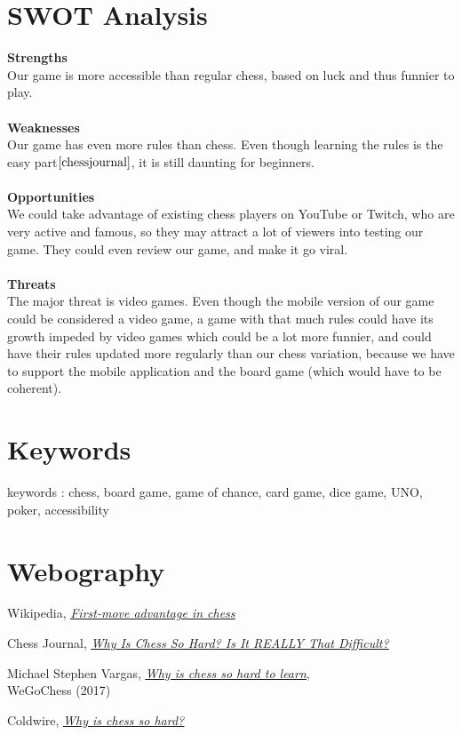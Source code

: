 \documentclass[12pt]{article}
\begin{document}
    \section{SWOT Analysis}
    \textbf{Strengths}
    \\Our game is more accessible than regular chess, based on luck and thus funnier to play.
    \\\\\textbf{Weaknesses}
    \\Our game has even more rules than chess. Even though learning the rules is the easy part$\cite{chessjournal}$, it is still daunting for beginners.
    \\\\\textbf{Opportunities}
    \\We could take advantage of existing chess players on YouTube or Twitch, who are very active and famous, so they may attract a lot of viewers into testing our game. They could even review our game, and make it go viral.
    \\\\\textbf{Threats} 
    \\The major threat is video games. Even though the mobile version of our game could be considered a video game, a game with that much rules could have its growth impeded by video games which could be a lot more funnier, and could have their rules updated more regularly than our chess variation, because we have to support the mobile application and the board game (which would have to be coherent).

    \section{Keywords}
        keywords : chess, board game, game of chance, card game, dice game, UNO, poker, accessibility
    
    \section{Webography}
        \begin{thebibliography}{9}
                Wikipedia, \textit{\href{https://en.wikipedia.org/wiki/First-move_advantage_in_chess}{\underline{First-move advantage in chess}} }
                
                Chess Journal, \textit{\href{https://www.chessjournal.com/why-is-chess-so-hard/}{\underline{Why Is Chess So Hard? Is It REALLY That Difficult?}} }
            
                Michael Stephen Vargas, \href{
        https://wegochess.com/why-is-chess-so-hard-to-learn/}{\underline{\textit{Why is chess so hard to learn}}},
                \\WeGoChess (2017)
            
                Coldwire,
                \href{https://www.thecoldwire.com/why-is-chess-so-hard/}{\underline{\textit{Why is chess so hard?}}}
        \end{thebibliography}
\end{document}
